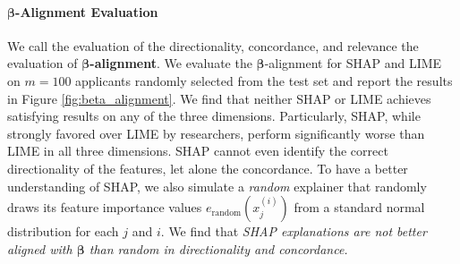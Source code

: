 \documentclass[mnsc,blindrev]{informs3}
\begin{document}
 \paragraph{$\boldsymbol{\beta}$-Alignment Evaluation}
  We call the evaluation of the directionality, concordance, and relevance the evaluation of \textbf{$\boldsymbol{\beta}$-alignment}.  We evaluate the $\boldsymbol{\beta}$-alignment
 for SHAP and LIME on $m=100$ applicants randomly selected from the test set and report the results in Figure \ref{fig:beta_alignment}. 
 We find that neither SHAP or LIME achieves satisfying results on any of the three dimensions. Particularly, SHAP, while strongly favored over LIME by researchers, perform significantly worse than LIME in all three dimensions. SHAP cannot even identify the correct directionality of the features, let alone the concordance. To have a better understanding of SHAP, we also simulate a \emph{random} explainer that randomly draws its feature importance values $e_\text{random}(x^{(i)}_j)$ from a standard normal distribution for each $j$ and $i$. We find that \emph{SHAP explanations are not better aligned with $\boldsymbol{\beta}$ than random in directionality and concordance.} 
        
\end{document}

